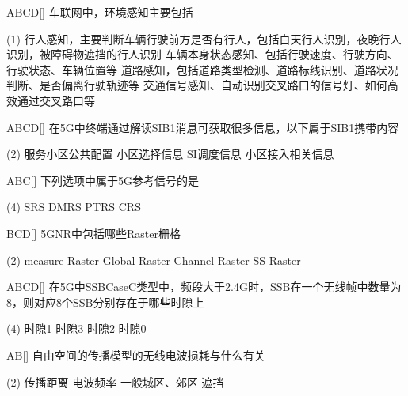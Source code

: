 \begin{choice}{\;ABCD\;}[]
    车联网中，环境感知主要包括
    \begin{tasks}(1)
        \task 行人感知，主要判断车辆行驶前方是否有行人，包括白天行人识别，夜晚行人识别，被障碍物遮挡的行人识别
        \task 车辆本身状态感知、包括行驶速度、行驶方向、行驶状态、车辆位置等
        \task  道路感知，包括道路类型检测、道路标线识别、道路状况判断、是否偏离行驶轨迹等
        \task 交通信号感知、自动识别交叉路口的信号灯、如何高效通过交叉路口等
    \end{tasks}
\end{choice}

\begin{choice}{\;ABCD\;}[]
    在5G中终端通过解读SIB1消息可获取很多信息，以下属于SIB1携带内容
    \begin{tasks}(2)
        \task 服务小区公共配置
        \task 小区选择信息
        \task SI调度信息
        \task 小区接入相关信息
    \end{tasks}
\end{choice}

\begin{choice}{\;ABC\;}[]
    下列选项中属于5G参考信号的是
    \begin{tasks}(4)
        \task SRS
        \task DMRS
        \task PTRS
        \task CRS
    \end{tasks}
\end{choice}

\begin{choice}{\;BCD\;}[]
    5G\;NR中包括哪些Raster栅格
    \begin{tasks}(2)
        \task measure Raster
        \task Global Raster
        \task Channel Raster
        \task SS Raster
    \end{tasks}
\end{choice}

\begin{choice}{\;ABCD\;}[]
    在5G中SSB\;Case\;C类型中，频段大于2.4G时，SSB在一个无线帧中数量为8，则对应8个SSB分别存在于哪些时隙上
    \begin{tasks}(4)
        \task 时隙1
        \task 时隙3
        \task 时隙2
        \task 时隙0
    \end{tasks}
\end{choice}

\begin{choice}{\;AB\;}[]
    自由空间的传播模型的无线电波损耗与什么有关
    \begin{tasks}(2)
        \task 传播距离
        \task 电波频率
        \task 一般城区、郊区
        \task 遮挡
    \end{tasks}
\end{choice}

